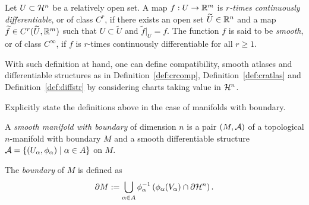 \begin{definition}
  Let $U\subset\mathcal{H}^n$ be a relatively open set. A map $f: U\to\mathbb{R}^m$ is \emph{$r$-times continuously differentiable}, or of class $C^r$, if there exists an open set $\widetilde U\in\mathbb{R}^n$ and a map $\widetilde f\in C^r(\widetilde U, \mathbb{R}^m)$ such that $U\subset\widetilde U$ and $\widetilde f|_U = f$.
  The function $f$ is said to be \emph{smooth}, or of class $C^\infty$, if $f$ is $r$-times continuously differentiable for all $r\geq 1$.
\end{definition}

With such definition at hand, one can define compatibility, smooth atlases and differentiable structures as in Definition~\ref{def:crcomp}, Definition~\ref{def:cratlas} and Definition~\ref{def:diffstr} by considering charts taking value in $\mathcal{H}^n$.

\begin{exercise}
  Explicitly state the definitions above in the case of manifolds with boundary.
\end{exercise}

\begin{definition}\label{def:diffmanifoldwb}
  A \emph{smooth manifold with boundary} of dimension $n$ is a pair $(M, \mathcal{A})$ of a topological $n$-manifold with boundary $M$ and a smooth differentiable structure $\mathcal{A} = \{(U_\alpha, \phi_\alpha) \mid \alpha\in A\}$ on $M$.
  
  The \emph{boundary} of $M$ is defined as
  \begin{equation}\label{def:bdry}
    \partial M := \bigcup_{\alpha\in A} \phi_\alpha^{-1}\left(\phi_\alpha(V_\alpha)\cap \partial\mathcal{H}^n\right).
  \end{equation}
\end{definition}

